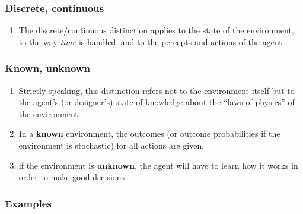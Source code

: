 \subsubsection{Discrete, continuous}
\begin{enumerate}
    \item The discrete/continuous distinction applies to the state of the environment, to the way \textit{time} is handled, and to the percepts and actions of the agent.
    \hfill \cite{ai/book/Artificial-Intelligence-A-Modern-Approach/Russell-Norvig}

    
\end{enumerate}



\subsubsection{Known, unknown}
\begin{enumerate}
    \item Strictly speaking, this distinction refers not to the environment itself but to the agent’s (or designer’s) state of knowledge about the “laws of physics” of the environment. 
    \hfill \cite{ai/book/Artificial-Intelligence-A-Modern-Approach/Russell-Norvig}

    \item In a \textbf{known} environment, the outcomes (or outcome probabilities if the environment is stochastic) for all actions are given.
    \hfill \cite{ai/book/Artificial-Intelligence-A-Modern-Approach/Russell-Norvig}

    \item  if the environment is \textbf{unknown}, the agent will have to learn how it works in order to make good decisions.
    \hfill \cite{ai/book/Artificial-Intelligence-A-Modern-Approach/Russell-Norvig}

    
\end{enumerate}



\subsubsection*{Examples \cite{ai/book/Artificial-Intelligence-A-Modern-Approach/Russell-Norvig}}

